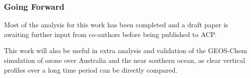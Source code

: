 \subsubsection{Going Forward}

Most of the analysis for this work has been completed and a draft paper is awaiting further input from co-authors before being published to ACP.

This work will also be useful in extra analysis and validation of the GEOS-Chem simulation of ozone over Australia and the near southern ocean, as clear vertical profiles over a long time period can be directly compared.